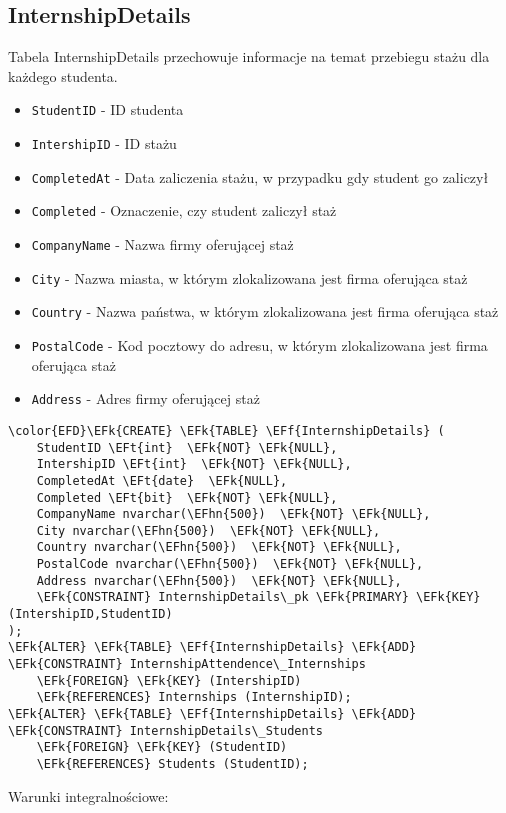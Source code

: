 \documentclass[11pt]{article}
\newcommand{\EFk}[1]{\textcolor{EFk}{\textbf{#1}}} %
\newcommand{\EFf}[1]{\textcolor{EFf}{#1}} %
\newcommand{\EFt}[1]{\textcolor{EFt}{\textbf{#1}}} %
\newcommand{\EFhn}[1]{\textcolor{EFhn}{#1}} %
\begin{document}
\subsection{InternshipDetails}
\label{sec:org14339e2}
Tabela InternshipDetails przechowuje informacje na temat przebiegu stażu dla każdego studenta.
\begin{itemize}
\item \texttt{StudentID} - ID studenta
\item \texttt{IntershipID} - ID stażu
\item \texttt{CompletedAt} - Data zaliczenia stażu, w przypadku gdy student go zaliczył
\item \texttt{Completed} - Oznaczenie, czy student zaliczył staż
\item \texttt{CompanyName} - Nazwa firmy oferującej staż
\item \texttt{City} - Nazwa miasta, w którym zlokalizowana jest firma oferująca staż
\item \texttt{Country} - Nazwa państwa, w którym zlokalizowana jest firma oferująca staż
\item \texttt{PostalCode} - Kod pocztowy do adresu, w którym zlokalizowana jest firma oferująca staż
\item \texttt{Address} - Adres firmy oferującej staż
\end{itemize}
\begin{Code}
\begin{Verbatim}
\color{EFD}\EFk{CREATE} \EFk{TABLE} \EFf{InternshipDetails} (
    StudentID \EFt{int}  \EFk{NOT} \EFk{NULL},
    IntershipID \EFt{int}  \EFk{NOT} \EFk{NULL},
    CompletedAt \EFt{date}  \EFk{NULL},
    Completed \EFt{bit}  \EFk{NOT} \EFk{NULL},
    CompanyName nvarchar(\EFhn{500})  \EFk{NOT} \EFk{NULL},
    City nvarchar(\EFhn{500})  \EFk{NOT} \EFk{NULL},
    Country nvarchar(\EFhn{500})  \EFk{NOT} \EFk{NULL},
    PostalCode nvarchar(\EFhn{500})  \EFk{NOT} \EFk{NULL},
    Address nvarchar(\EFhn{500})  \EFk{NOT} \EFk{NULL},
    \EFk{CONSTRAINT} InternshipDetails\_pk \EFk{PRIMARY} \EFk{KEY}  (IntershipID,StudentID)
);
\EFk{ALTER} \EFk{TABLE} \EFf{InternshipDetails} \EFk{ADD} \EFk{CONSTRAINT} InternshipAttendence\_Internships
    \EFk{FOREIGN} \EFk{KEY} (IntershipID)
    \EFk{REFERENCES} Internships (InternshipID);
\EFk{ALTER} \EFk{TABLE} \EFf{InternshipDetails} \EFk{ADD} \EFk{CONSTRAINT} InternshipDetails\_Students
    \EFk{FOREIGN} \EFk{KEY} (StudentID)
    \EFk{REFERENCES} Students (StudentID);
\end{Verbatim}
\end{Code}
Warunki integralnościowe:
\end{document}
